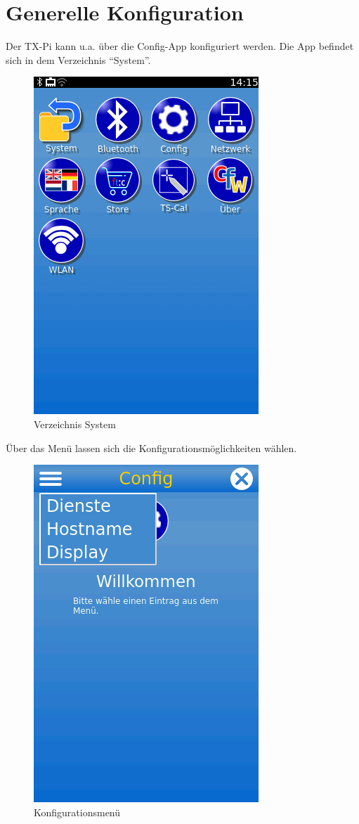 \documentclass[
  paper=A4,
  ngerman,
  fontsize=12pt,
  parskip=half-,
]{scrbook}
\begin{document}
\section{Generelle Konfiguration}
\label{sec:config}

Der TX-Pi kann u.a. über die Config-App konfiguriert werden. Die App befindet sich
in dem Verzeichnis "`System"'.

\begin{figure}[h]
\centering
\includegraphics[scale=0.4]{images/gui-system.png}
\caption{Verzeichnis System}
\end{figure}

Über das Menü lassen sich die Konfigurationsmöglichkeiten wählen.

\begin{figure}[h]
\centering
\includegraphics[scale=0.4]{images/config-menu.png}
\caption{Konfigurationsmenü}
\end{figure}
\end{document}

